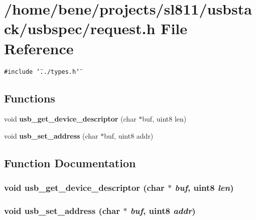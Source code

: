 \section{/home/bene/projects/sl811/usbstack/usbspec/request.h File Reference}
\label{request_8h}
{\tt \#include \char`\"{}../types.h\char`\"{}}\par
\subsection*{Functions}
\begin{CompactItemize}
\item 
void {\bf usb\_\-get\_\-device\_\-descriptor} (char $\ast$buf, uint8 len)
\item 
void {\bf usb\_\-set\_\-address} (char $\ast$buf, uint8 addr)
\end{CompactItemize}


\subsection{Function Documentation}
\subsubsection{\setlength{\rightskip}{0pt plus 5cm}void usb\_\-get\_\-device\_\-descriptor (char $\ast$ {\em buf}, uint8 {\em len})}\label{request_8h_571756ad9a52471ec8f24179d921e445}


\subsubsection{\setlength{\rightskip}{0pt plus 5cm}void usb\_\-set\_\-address (char $\ast$ {\em buf}, uint8 {\em addr})}\label{request_8h_f69d0b47f478e7441601829c6c4d0d17}


